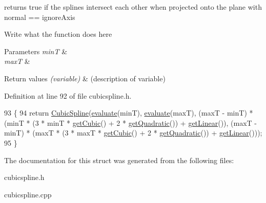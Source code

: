 returns true if the splines intersect each other when projected onto the plane with normal == ignore\+Axis 

Write what the function does here


\begin{DoxyParams}{Parameters}
{\em min\+T} & \\
\hline
{\em max\+T} & \\
\hline
\end{DoxyParams}

\begin{DoxyRetVals}{Return values}
{\em (variable)} & (description of variable) \\
\hline
\end{DoxyRetVals}


Definition at line 92 of file cubicspline.\+h.


\begin{DoxyCode}
93     \{
94         \textcolor{keywordflow}{return} \hyperlink{structCubicSpline}{CubicSpline}(\hyperlink{structCubicSpline_a6b5d7cf704ce35a9bce93d6faf53a4fe}{evaluate}(minT), \hyperlink{structCubicSpline_a6b5d7cf704ce35a9bce93d6faf53a4fe}{evaluate}(maxT), (maxT - minT) * (minT
       * (3 * minT * \hyperlink{structCubicSpline_a156525e59dae0cac2a81cf34cb673c87}{getCubic}() + 2 * \hyperlink{structCubicSpline_a7d5792ff1314032122cd342d0616a50f}{getQuadratic}()) + \hyperlink{structCubicSpline_ada872ef617b059ef68490e828bcdf181}{getLinear}()), (maxT - minT) *
       (maxT * (3 * maxT * \hyperlink{structCubicSpline_a156525e59dae0cac2a81cf34cb673c87}{getCubic}() + 2 * \hyperlink{structCubicSpline_a7d5792ff1314032122cd342d0616a50f}{getQuadratic}()) + 
      \hyperlink{structCubicSpline_ada872ef617b059ef68490e828bcdf181}{getLinear}()));
95     \}
\end{DoxyCode}


The documentation for this struct was generated from the following files\+:\begin{DoxyCompactItemize}
\item 
cubicspline.\+h\item 
cubicspline.\+cpp\end{DoxyCompactItemize}
